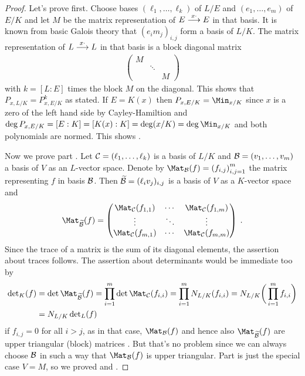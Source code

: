 \documentclass[a4paper,parskip=half,numbers=enddot, DIV=12]{scrreprt}
\begin{document}
\begin{proof}
		Let's prove  first. Choose bases $(\ell_1,\ldots,\ell_k)$ of $L/E$ and $(e_1,\ldots,e_m)$ of $E/K$ and let $M$ be the matrix representation of $E\morphism[x\cdot] E$ in that basis. It is known from basic Galois theory that $(e_im_j)_{i,j}$ form a basis of $L/K$. The matrix representation of $L\morphism[x\cdot] L$ in that basis is a block diagonal matrix 
		\begin{align*}
			\begin{pmatrix}
				M & & \\
				 & \ddots & \\
				  & & M
			\end{pmatrix}
		\end{align*}
		with $k=[L:E]$ times the block $M$ on the diagonal. This shows that $P_{x,L/K} = P_{x,E/K}^k$ as stated. If $E=K(x)$ then $P_{x,E/K} = \Min_{x/K}$ since $x$ is a zero of the left hand side by Cayley-Hamiltion and $\deg P_{x,E/K} = [E:K] = [K(x):K] = \deg(x/K) = \deg \Min_{x/K}$ and both polynomials are normed. This shows .
		
		Now we prove part . Let $\mathcal{C}=(\ell_1,\ldots, \ell_k)$ is a basis of $L/K$ and $\mathcal{B}=(v_1,\ldots,v_m)$ a basis of $V$ as an $L$-vector space. Denote by $\Mat_\Bb(f) =\left(f_{i,j}\right)_{i,j=1}^m$ the matrix representing $f$ in basis $\mathcal{B}$. Then $\snake \Bb= (\ell_iv_j)_{i,j}$ is a basis of $V$ as a $K$-vector space and 
		\begin{align*}
			\Mat_{\snake{\Bb}}(f)=
			\begin{pmatrix}
				\Mat_{\Cc}(f_{1,1}) & \cdots & \Mat_\Cc(f_{1,m}) \\
				\vdots & \ddots & \vdots \\
				\Mat_\Cc(f_{m,1}) & \cdots & \Mat_\Cc(f_{m,m})
			\end{pmatrix}\;.
		\end{align*}		
		Since the trace of a matrix is the sum of its diagonal elements, the assertion about traces follows. The assertion about determinants would be immediate too by
		\begin{align*}
			\det_K(f)&=\det\Mat_{\snake \Bb}(f)=\prod_{i=1}^{m}\det\Mat_\Cc(f_{i,i})=\prod_{i=1}^{m}N_{L/K}(f_{i,i})=N_{L/K}\bigg(\prod_{i=1}^{m}f_{i,i}\bigg)\\
			&=N_{L/K}\det_L(f)
		\end{align*}
		if $f_{i,j}=0$ for all $i>j$, as in that case, $\Mat_\Bb(f)$ and hence also $\Mat_{\snake \Bb}(f)$ are upper triangular (block) matrices . But that's no problem since we can always choose $\mathcal{B}$ in such a way that $\Mat_\Bb(f)$ is upper triangular. Part  is just the special case $V=M$, so we proved  and .
		

\end{proof}
\end{document}

